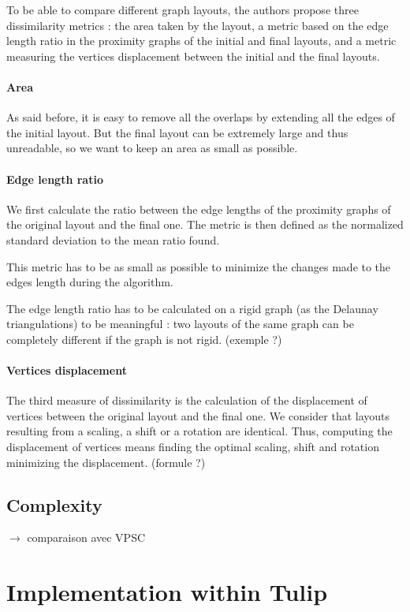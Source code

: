 \documentclass[12pt]{report}
\begin{document}
To be able to compare different graph layouts, the authors propose three dissimilarity metrics : the area taken by the layout, a metric based on the edge length ratio in the proximity graphs of the initial and final layouts, and a metric measuring the vertices displacement between the initial and the final layouts.

\subsubsection{Area}
As said before, it is easy to remove all the overlaps by extending all the edges of the initial layout. But the final layout can be extremely large and thus unreadable, so we want to keep an area as small as possible.

\subsubsection{Edge length ratio}
We first calculate the ratio between the edge lengths of the proximity graphs of the original layout and the final one. The metric is then defined as the normalized standard deviation to the mean ratio found.

This metric has to be as small as possible to minimize the changes made to the edges length during the algorithm.

The edge length ratio has to be calculated on a rigid graph (as the Delaunay triangulations) to be meaningful : two layouts of the same graph can be completely different if the graph is not rigid. (exemple ?)

\subsubsection{Vertices displacement}

The third measure of dissimilarity is the calculation of the displacement of vertices between the original layout and the final one. We consider that layouts resulting from a scaling, a shift or a rotation are identical. Thus, computing the displacement of vertices means finding the optimal scaling, shift and rotation minimizing the displacement. (formule ?)

\section{Complexity}


$\rightarrow$ comparaison avec VPSC
\chapter{Implementation within Tulip}
\end{document}
